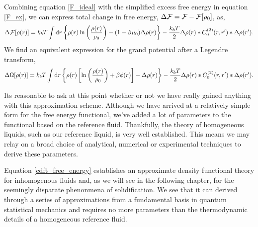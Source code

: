%
Combining equation \ref{F_ideal} with the simplified excess free energy in
equation \ref{F_ex}, we can express total change in free energy, $\Delta \mathcal{F} =
\mathcal{F} - \mathcal{F}[\rho_0]$, as,
%
\begin{equation}
    \label{cdft_free_energy}
    \Delta \mathcal{F} [\rho(r)] 
        = k_b T\int \mathrm{d}r 
            \left\lbrace \rho(r) \ln\left(\frac{\rho(r)}{\rho_0} \right) 
            - (1-\beta\mu_0) \Delta \rho(r)\right\rbrace 
        - \frac{k_b T}{2}\Delta \rho(r) \ast C_0^{(2)}(r, r^\prime) 
            \ast \Delta \rho(r^\prime).
\end{equation}
%
We find an equivalent expression for the grand potential after a Legendre
transform,
%
\begin{equation}
    \label{cdft_grand_potential}
    \Delta \Omega [\rho(r)]
        = k_b T\int \mathrm{d}r 
            \left\lbrace \rho(r) \left[\ln\left(\frac{\rho(r)}{\rho_0} \right) 
            + \beta\phi(r) \right] -  \Delta \rho(r)\right\rbrace 
        - \frac{k_b T}{2}\Delta \rho(r) \ast C_0^{(2)}(r, r^\prime) 
            \ast \Delta \rho(r^\prime).
\end{equation}


Its reasonable to ask at this point whether or not we have really gained
anything with this approximation scheme.  Although we have arrived at a
relatively simple form for the free energy functional, we've added a lot of
parameters to the functional based on the reference fluid.  Thankfully, the
theory of homogeneous liquids, such as our reference liquid, is very well
established.  This means we may relay on a broad choice of analytical,
numerical or experimental techniques to derive these parameters.

Equation \ref{cdft_free_energy} establishes an approximate density functional
theory for inhomogenous fluids and, as we will see in the following chapter,
for the seemingly disparate phenonmena of solidification. We see that it can
derived through a series of approximations from a fundamental basis in quantum
statistical mechanics and requires no more parameters than the thermodynamic
details of a homogeneous reference fluid.
